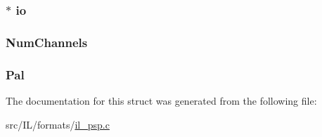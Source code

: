 \hypertarget{struct_p_s_p___c_t_x_ab6115e5993ca62edfb3a32ef981294c5}{
\subsubsection[{io}]{$\ast$ io}}\label{struct_p_s_p___c_t_x_ab6115e5993ca62edfb3a32ef981294c5}
\hypertarget{struct_p_s_p___c_t_x_a425822f038f4742108b502daa6747052}{
\subsubsection[{Num\-Channels}]{ Num\-Channels}}\label{struct_p_s_p___c_t_x_a425822f038f4742108b502daa6747052}
\hypertarget{struct_p_s_p___c_t_x_a689bdcea4bd95419044f5d0bd992dc3b}{
\subsubsection[{Pal}]{ Pal}}\label{struct_p_s_p___c_t_x_a689bdcea4bd95419044f5d0bd992dc3b}


The documentation for this struct was generated from the following file\-:\begin{DoxyCompactItemize}
\item 
src/\-I\-L/formats/\hyperlink{il__psp_8c}{il\-\_\-psp.\-c}\end{DoxyCompactItemize}
